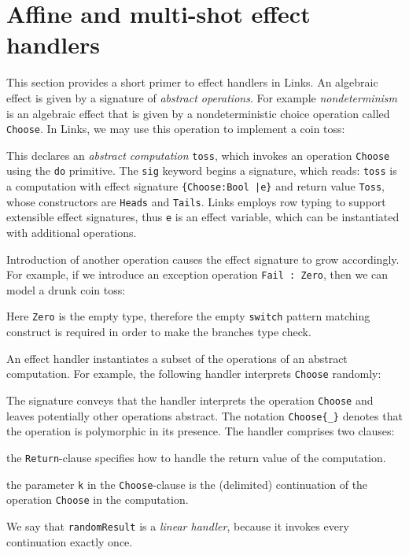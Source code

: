 \documentclass[preprint,numbers]{sigplanconf}
\begin{document}
\section{Affine and multi-shot effect handlers}
This section provides a short primer to effect handlers in Links. An algebraic
effect is given by a signature of \emph{abstract operations}. For example
\emph{nondeterminism} is an algebraic effect that is given by a
nondeterministic choice operation called \lstinline$Choose$. In Links, we may
use this operation to implement a coin toss:
%

%
This declares an \emph{abstract computation} \lstinline$toss$, which invokes an
operation \lstinline$Choose$ using the \lstinline$do$ primitive.  The
\lstinline$sig$ keyword begins a signature, which reads: \lstinline$toss$ is a
computation with effect signature \lstinline${Choose:Bool |e}$ and return value
\lstinline$Toss$, whose constructors are \lstinline$Heads$ and
\lstinline$Tails$.  Links employs row typing to support extensible effect
signatures, thus \lstinline$e$ is an effect variable, which can be instantiated
with additional operations.

Introduction of another operation causes the effect signature to grow
accordingly. For example, if we introduce an exception operation
\lstinline$Fail : Zero$, then we can model a drunk coin toss:
%

%
Here \lstinline$Zero$ is the empty type, therefore the empty
\lstinline$switch$ pattern matching construct is required in order to
make the branches type check.

An effect handler instantiates a subset of the operations of an
abstract computation. For example, the following handler interprets
\lstinline$Choose$ randomly:
%

%
The signature conveys that the handler interprets the operation
\lstinline$Choose$ and leaves potentially other operations
abstract. The notation \lstinline$Choose{_}$ denotes that the
operation is polymorphic in its presence.  The handler comprises two
clauses:
\begin{enumerate*}[label={\roman*)}]
\item the \lstinline$Return$-clause specifies how to handle the return
  value of the computation.
\item the parameter \lstinline$k$ in the \lstinline$Choose$-clause is
  the (delimited) continuation of the operation \lstinline$Choose$ in the
  computation.
\end{enumerate*}
We say that \lstinline$randomResult$ is a \emph{linear handler}, because
it invokes every continuation exactly once.
\end{document}

